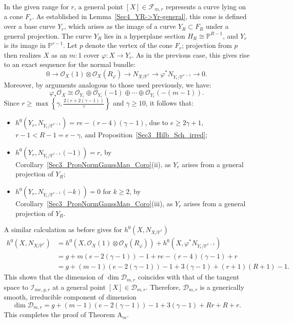 \documentclass[a4paper,12pt]{amsart}
\def\dim{\operatorname{dim}}
\begin{document}
In the given range for $r$, a general point $[X] \in \mathcal{F}_{m,r}$ represents a curve lying on a cone $F_r$. As established in \textnormal{Lemma~\ref{Sec4_YR->Yr-general}}, this cone is defined over a base curve $Y_r$, which arises as the image of a curve $Y_R \subset F_R$ under a general projection. The curve $Y_R$ lies in a hyperplane section $H_R \cong \mathbb{P}^{R-1}$, and $Y_r$ is its image in $\mathbb{P}^{r-1}$. Let $p$ denote the vertex of the cone $F_r$; projection from $p$ then realizes $X$ as an $m:1$ cover $\varphi : X \to Y_r$. As in the previous case, this gives rise to an exact sequence for the normal bundle:
\begin{equation*}\label{NormBundSeq_p_away_Sec4_Pr}
 0 \to \mathcal{O}_X (1) \otimes \mathcal{O}_X (R_{\varphi}) \to N_{X / \mathbb{P}^r} \to \varphi^{\ast} N_{Y_r / \mathbb{P}^{r-1}} \to 0 .
\end{equation*}
Moreover, by arguments analogous to those used previously, we have:
\begin{equation*}\label{Sec4_varphi*Pr}
 \varphi_{\ast} \mathcal{O}_X \cong \mathcal{O}_{Y_r} \oplus \mathcal{O}_{Y_r} (-1) \oplus \cdots \oplus \mathcal{O}_{Y_r} (-(m-1)).
\end{equation*}
Since $r \geq \max \left\lbrace \gamma, \frac{2(e+2(\gamma-1))}{\gamma} \right\rbrace$ and $\gamma \geq 10$, it follows that:
\begin{itemize}
 \item $h^0 (Y_r, N_{Y_r/ \mathbb{P}^{r-1}}) = re - (r-4)(\gamma - 1)$, due to $e \geq 2\gamma + 1$, $r-1 < R-1 = e - \gamma$, and \textnormal{Proposition~\ref{Sec3_Hilb_Sch_irred}};

 \item $h^0 (Y_r, N_{Y_r/ \mathbb{P}^{r-1}} (-1)) = r$, by \textnormal{Corollary~\ref{Sec3_PropNormGaussMap_Coro}(ii)}, as $Y_r$ arises from a general projection of $Y_R$;

 \item $h^0 (Y_r, N_{Y_r/ \mathbb{P}^{r-1}} (-k)) = 0$ for $k \geq 2$, by \textnormal{Corollary~\ref{Sec3_PropNormGaussMap_Coro}(iii)}, as $Y_r$ arises from a general projection of $Y_R$.
\end{itemize}
A similar calculation as before gives for $h^0 (X, N_{X/ \mathbb{P}^r})$
\[
 \begin{aligned}
  h^0 (X, N_{X/ \mathbb{P}^r}) & =
  h^0 (X, \mathcal{O}_X (1) \otimes \mathcal{O}_X (R_{\varphi})) + h^0 (X, \varphi^{\ast} N_{Y_r / \mathbb{P}^{r-1}}) \\
  & = g + m(e - 2(\gamma - 1)) - 1 + re - (r-4)(\gamma - 1) + r \\
  & = g + (m-1)(e - 2(\gamma-1)) - 1 + 3(\gamma-1) + (r+1)(R+1) - 1 .
 \end{aligned}
\]
This shows that the dimension of $\dim \mathcal{D}_{m,r}$ coincides with that of the tangent space to $\mathcal{I}_{me, g, r}$ at a general point $[X] \in \mathcal{D}_{m,r}$. Therefore, $\mathcal{D}_{m,r}$ is a generically smooth, irreducible component of  dimension
\[
 \dim \mathcal{D}_{m,r} = g + (m-1)(e - 2(\gamma-1)) - 1 + 3(\gamma-1) + Rr+R+r .
\]
This completes the proof of {\rm Theorem A$_m$.}
\end{document}
